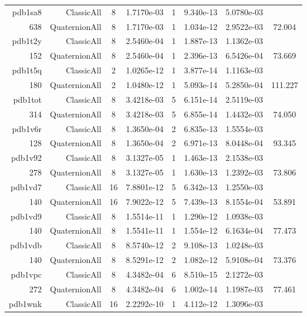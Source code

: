 \begin{xltabular}{\textwidth}{r|rcS[table-format=1.4e+2]cS[table-format=1.3e+2]S[table-format=1.4e+2]S[table-format=-1.3]}
pdb1sa8 & ClassicAll & 8 & 1.7170e-03 & 1 & 9.340e-13 & 5.0780e-03 & \\
638 & QuaternionAll & 8 & 1.7170e-03 & 1 & 1.034e-12 & 2.9522e-03 & 72.004\\  \addlinespace
pdb1t2y & ClassicAll & 8 & 2.5460e-04 & 1 & 1.887e-13 & 1.1362e-03 & \\
152 & QuaternionAll & 8 & 2.5460e-04 & 1 & 2.396e-13 & 6.5426e-04 & 73.669\\  \addlinespace
pdb1t5q & ClassicAll & 2 & 1.0265e-12 & 1 & 3.877e-14 & 1.1163e-03 & \\
180 & QuaternionAll & 2 & 1.0480e-12 & 1 & 5.093e-14 & 5.2850e-04 & 111.227\\  \addlinespace
pdb1tot & ClassicAll & 8 & 3.4218e-03 & 5 & 6.151e-14 & 2.5119e-03 & \\
314 & QuaternionAll & 8 & 3.4218e-03 & 5 & 6.855e-14 & 1.4432e-03 & 74.050\\  \addlinespace
pdb1v6r & ClassicAll & 8 & 1.3650e-04 & 2 & 6.835e-13 & 1.5554e-03 & \\
128 & QuaternionAll & 8 & 1.3650e-04 & 2 & 6.971e-13 & 8.0448e-04 & 93.345\\  \addlinespace
pdb1v92 & ClassicAll & 8 & 3.1327e-05 & 1 & 1.463e-13 & 2.1538e-03 & \\
278 & QuaternionAll & 8 & 3.1327e-05 & 1 & 1.630e-13 & 1.2392e-03 & 73.806\\  \addlinespace
pdb1vd7 & ClassicAll & 16 & 7.8801e-12 & 5 & 6.342e-13 & 1.2550e-03 & \\
140 & QuaternionAll & 16 & 7.9022e-12 & 5 & 7.439e-13 & 8.1554e-04 & 53.891\\  \addlinespace
pdb1vd9 & ClassicAll & 8 & 1.5514e-11 & 1 & 1.290e-12 & 1.0938e-03 & \\
140 & QuaternionAll & 8 & 1.5541e-11 & 1 & 1.554e-12 & 6.1634e-04 & 77.473\\  \addlinespace
pdb1vdb & ClassicAll & 8 & 8.5740e-12 & 2 & 9.108e-13 & 1.0248e-03 & \\
140 & QuaternionAll & 8 & 8.5291e-12 & 2 & 1.082e-12 & 5.9108e-04 & 73.376\\  \addlinespace
pdb1vpc & ClassicAll & 8 & 4.3482e-04 & 6 & 8.510e-15 & 2.1272e-03 & \\
272 & QuaternionAll & 8 & 4.3482e-04 & 6 & 1.002e-14 & 1.1987e-03 & 77.461\\  \addlinespace
pdb1wnk & ClassicAll & 16 & 2.2292e-10 & 1 & 4.112e-12 & 1.3096e-03 & \\

\end{xltabular}
